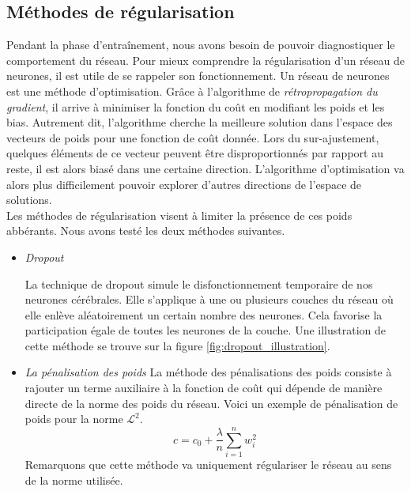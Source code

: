 \documentclass[a4paper,11pt]{article}
\begin{document}
\subsection{Méthodes de régularisation}
\label{sec:regularization}
    
    Pendant la phase d'entraînement, nous avons besoin de pouvoir diagnostiquer le comportement du réseau.
    Pour mieux comprendre la régularisation d'un réseau de neurones, il est utile de se rappeler son fonctionnement.
    Un réseau de neurones est une méthode d'optimisation.
    Grâce à l'algorithme de \textit{rétropropagation du gradient}, il arrive à minimiser la fonction du coût en modifiant les poids et les bias.
    Autrement dit, l'algorithme cherche la meilleure solution dans l'espace des vecteurs de poids pour une fonction de coût donnée.
    Lors du sur-ajustement, quelques éléments de ce vecteur peuvent être disproportionnés par rapport au reste, il est alors biasé dans une certaine direction.
    L'algorithme d'optimisation va alors plus difficilement pouvoir explorer d'autres directions de l'espace de solutions.
    \\
    Les méthodes de régularisation visent à limiter la présence de ces poids abbérants.
    Nous avons testé les deux méthodes suivantes. 
    \begin{itemize}
        \item{\textit{Dropout}}

            La technique de dropout simule le disfonctionnement temporaire de nos neurones cérébrales.
            Elle s'applique à une ou plusieurs couches du réseau où elle enlève aléatoirement un certain nombre des neurones.
            Cela favorise la participation égale de toutes les neurones de la couche.
            Une illustration de cette méthode se trouve sur la figure \ref{fig:dropout_illustration}. 

        \item{\textit{La pénalisation des poids}}
            La méthode des pénalisations des poids consiste à rajouter un terme auxiliaire à la fonction de coût qui dépende de manière directe de la norme des poids du réseau.
            Voici un exemple de pénalisation de poids pour la norme $\mathcal{L}^2$.
            \begin{equation*}
                c = c_0 + \frac{\lambda}{n}\sum_{i=1}^n w_i^2
            \end{equation*}
        Remarquons que cette méthode va uniquement régulariser le réseau au sens de la norme utilisée.
    \end{itemize}
\end{document}
